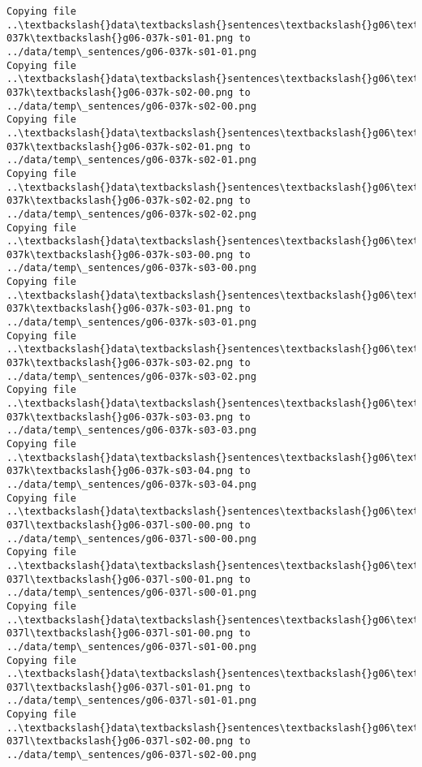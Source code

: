 \documentclass[11pt]{article}
\begin{document}
\begin{Verbatim}[commandchars=\\\{\}]
Copying file ..\textbackslash{}data\textbackslash{}sentences\textbackslash{}g06\textbackslash{}g06-037k\textbackslash{}g06-037k-s01-01.png to
../data/temp\_sentences/g06-037k-s01-01.png
Copying file ..\textbackslash{}data\textbackslash{}sentences\textbackslash{}g06\textbackslash{}g06-037k\textbackslash{}g06-037k-s02-00.png to
../data/temp\_sentences/g06-037k-s02-00.png
Copying file ..\textbackslash{}data\textbackslash{}sentences\textbackslash{}g06\textbackslash{}g06-037k\textbackslash{}g06-037k-s02-01.png to
../data/temp\_sentences/g06-037k-s02-01.png
Copying file ..\textbackslash{}data\textbackslash{}sentences\textbackslash{}g06\textbackslash{}g06-037k\textbackslash{}g06-037k-s02-02.png to
../data/temp\_sentences/g06-037k-s02-02.png
Copying file ..\textbackslash{}data\textbackslash{}sentences\textbackslash{}g06\textbackslash{}g06-037k\textbackslash{}g06-037k-s03-00.png to
../data/temp\_sentences/g06-037k-s03-00.png
Copying file ..\textbackslash{}data\textbackslash{}sentences\textbackslash{}g06\textbackslash{}g06-037k\textbackslash{}g06-037k-s03-01.png to
../data/temp\_sentences/g06-037k-s03-01.png
Copying file ..\textbackslash{}data\textbackslash{}sentences\textbackslash{}g06\textbackslash{}g06-037k\textbackslash{}g06-037k-s03-02.png to
../data/temp\_sentences/g06-037k-s03-02.png
Copying file ..\textbackslash{}data\textbackslash{}sentences\textbackslash{}g06\textbackslash{}g06-037k\textbackslash{}g06-037k-s03-03.png to
../data/temp\_sentences/g06-037k-s03-03.png
Copying file ..\textbackslash{}data\textbackslash{}sentences\textbackslash{}g06\textbackslash{}g06-037k\textbackslash{}g06-037k-s03-04.png to
../data/temp\_sentences/g06-037k-s03-04.png
Copying file ..\textbackslash{}data\textbackslash{}sentences\textbackslash{}g06\textbackslash{}g06-037l\textbackslash{}g06-037l-s00-00.png to
../data/temp\_sentences/g06-037l-s00-00.png
Copying file ..\textbackslash{}data\textbackslash{}sentences\textbackslash{}g06\textbackslash{}g06-037l\textbackslash{}g06-037l-s00-01.png to
../data/temp\_sentences/g06-037l-s00-01.png
Copying file ..\textbackslash{}data\textbackslash{}sentences\textbackslash{}g06\textbackslash{}g06-037l\textbackslash{}g06-037l-s01-00.png to
../data/temp\_sentences/g06-037l-s01-00.png
Copying file ..\textbackslash{}data\textbackslash{}sentences\textbackslash{}g06\textbackslash{}g06-037l\textbackslash{}g06-037l-s01-01.png to
../data/temp\_sentences/g06-037l-s01-01.png
Copying file ..\textbackslash{}data\textbackslash{}sentences\textbackslash{}g06\textbackslash{}g06-037l\textbackslash{}g06-037l-s02-00.png to
../data/temp\_sentences/g06-037l-s02-00.png

\end{Verbatim}
\end{document}
